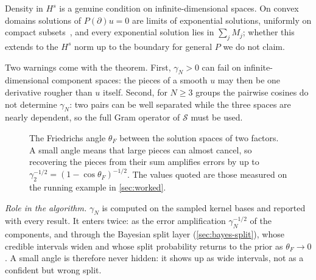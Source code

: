 \documentclass[11pt]{article}
\theoremstyle{plain}
\theoremstyle{definition}
\theoremstyle{remark}
\newcommand{\sumop}{\mathcal{S}}            %
\newcommand{\cF}{c_{F}}                     %
\newcommand{\thetaF}{\theta_{F}}            %
\newcommand{\gN}{\gamma_{N}}                %
\newcommand{\Hs}{H^{s}}                     %
\newcommand{\roleinalg}[1]{\par\noindent\emph{Role in the algorithm.} #1\par}
\begin{document}
Density in $\Hs$ is a genuine condition on infinite-dimensional spaces. On convex domains solutions of
$P(\partial)u=0$ are limits of exponential solutions, uniformly on compact subsets~\cite{Mal56,Hor90},
and every exponential solution lies in $\sum_jM_j$; whether this extends to the $\Hs$ norm up to the boundary
for general $P$ we do not claim.

Two warnings come with the theorem. First, $\gN>0$ can fail on infinite-dimensional component spaces: the pieces of a smooth $u$ may then be
one derivative rougher than $u$ itself. Second, for $N\ge3$ groups the pairwise cosines do not
determine $\gN$: two pairs can be well separated while the three spaces are nearly dependent, so the
full Gram operator of $\sumop$ must be used.

\begin{figure}[tbp]
\centering
{}
\caption{The Friedrichs angle $\thetaF$ between the solution spaces of two factors. A small angle
means that large pieces can almost cancel, so recovering the pieces from their sum amplifies errors by
up to $\gamma_2^{-1/2}=(1-\cos\thetaF)^{-1/2}$. The values quoted are those measured on the running
example in \cref{sec:worked}.}\label{fig:friedrichs}
\end{figure}

\roleinalg{$\gN$ is computed on the sampled kernel bases and reported with every result.
It enters twice: as the error amplification $\gN^{-1/2}$ of the components, and through the Bayesian
split layer (\cref{sec:bayes-split}), whose credible intervals widen and whose split probability
returns to the prior as $\thetaF\to0$. A small angle is therefore never hidden: it shows up as wide
intervals, not as a confident but wrong split.}

\end{document}

